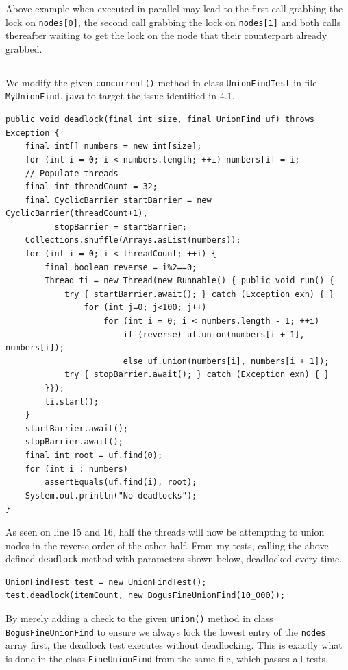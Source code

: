 \documentclass[a5paper]{article}
\begin{document}
Above example when executed in parallel may lead to the first call grabbing the lock on \texttt{nodes[0]}, the second call grabbing the lock on \texttt{nodes[1]} and both calls thereafter waiting to get the lock on the node that their counterpart already grabbed.

\subsection{}
We modify the given \texttt{concurrent()} method in class \texttt{UnionFindTest} in file \texttt{MyUnionFind.java} to target the issue identified in 4.1.
\begin{lstlisting}
public void deadlock(final int size, final UnionFind uf) throws Exception {
    final int[] numbers = new int[size];
    for (int i = 0; i < numbers.length; ++i) numbers[i] = i;
    // Populate threads
    final int threadCount = 32;
    final CyclicBarrier startBarrier = new CyclicBarrier(threadCount+1), 
          stopBarrier = startBarrier;
    Collections.shuffle(Arrays.asList(numbers));
    for (int i = 0; i < threadCount; ++i) {
        final boolean reverse = i%2==0;
        Thread ti = new Thread(new Runnable() { public void run() {
            try { startBarrier.await(); } catch (Exception exn) { }
                for (int j=0; j<100; j++)
                    for (int i = 0; i < numbers.length - 1; ++i) 
                        if (reverse) uf.union(numbers[i + 1], numbers[i]);
                        else uf.union(numbers[i], numbers[i + 1]);
            try { stopBarrier.await(); } catch (Exception exn) { }
        }});
        ti.start();
    }
    startBarrier.await();
    stopBarrier.await();
    final int root = uf.find(0);
    for (int i : numbers) 
        assertEquals(uf.find(i), root);
    System.out.println("No deadlocks");
}
\end{lstlisting}

As seen on line 15 and 16, half the threads will now be attempting to union nodes in the reverse order of the other half.
From my tests, calling the above defined \texttt{deadlock} method with parameters shown below, deadlocked every time.

\begin{lstlisting}
UnionFindTest test = new UnionFindTest();
test.deadlock(itemCount, new BogusFineUnionFind(10_000));
\end{lstlisting}

By merely adding a check to the given \texttt{union()} method in class \texttt{BogusFineUnionFind} to ensure we always lock the lowest entry of the \texttt{nodes} array first, the deadlock test
executes without deadlocking. This is exactly what is done in the class \texttt{FineUnionFind} from the same file, which passes all tests.
\end{document}
